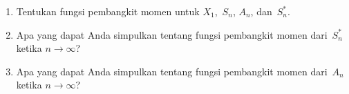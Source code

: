 \begin{LJSItem}
\begin{enumerate}
\item Tentukan fungsi pembangkit momen untuk $X_1$,~$S_n$, $A_n$,
dan~$S_n^*$.

\item Apa yang dapat Anda simpulkan tentang fungsi pembangkit momen dari~$S_n^*$ ketika $n
\to \infty$?

\item Apa yang dapat Anda simpulkan tentang fungsi pembangkit momen dari~$A_n$ ketika $n
\to \infty$?
\end{enumerate}
 
\end{LJSItem}
